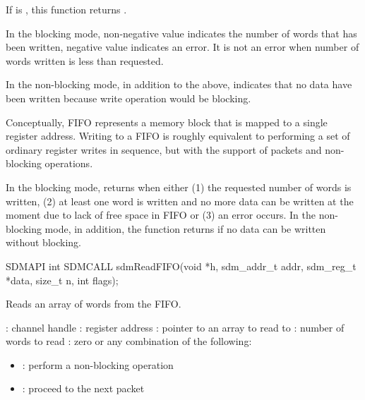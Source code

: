 \documentclass[a4paper,12pt,twoside,extrafontsizes]{memoir}
\begin{document}
\begin{funcret}
	If  is , this function returns .
	
	In the blocking mode, non-negative value indicates the number of words that has been written, negative value indicates an error. It is not an error when number of words written is less than requested.
	
	In the non-blocking mode, in addition to the above,  indicates that no data have been written because write operation would be blocking.
\end{funcret}

\begin{funcremarks}
	Conceptually, FIFO represents a memory block that is mapped to a single register address. Writing to a FIFO is roughly equivalent to performing a set of ordinary register writes in sequence, but with the support of packets and non-blocking operations.
	
	In the blocking mode,  returns when either (1) the requested number of words is written, (2) at least one word is written and no more data can be written at the moment due to lack of free space in FIFO or (3) an error occurs. In the non-blocking mode, in addition, the function returns if no data can be written without blocking.
\end{funcremarks}



\begin{cfuncprototype}
SDMAPI int SDMCALL sdmReadFIFO(void *h, sdm_addr_t addr, sdm_reg_t *data, size_t n, int flags);
\end{cfuncprototype}

\begin{funcdescr}
	Reads an array of words from the FIFO.
\end{funcdescr}

\begin{funcparams}
	: channel handle
	: register address
	: pointer to an array to read to
	: number of words to read
	: zero or any combination of the following:
		\begin{itemize}
			\item{}: perform a non-blocking operation
			\item{}: proceed to the next packet
		\end{itemize}
\end{funcparams}
\end{document}
